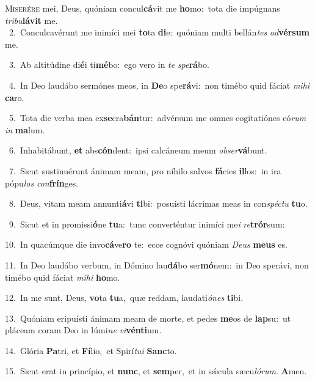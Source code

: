 \lettrine{\initial\textcolor{\initialcolor}{M}}{iserére} mei, Deus, quóniam concul\-\textbf{cá}\-vit me \textbf{ho}\-mo:~\star tota die impúgnans \textit{tri}\-\textit{bu}\textbf{lá}\textbf{vit} me.\\
{\numbfont\textcolor{\numbcolor}{~2.}}~Conculcavérunt me inimíci mei \textbf{to}\-ta \textbf{di}\-e:~\star quóniam multi bellán\textit{tes} \textit{ad}\-\textbf{vér}\textbf{sum} me.\par
{\numbfont\textcolor{\numbcolor}{~3.}}~Ab altitúdine di\-\textbf{é}\-i ti\-\textbf{mé}\-bo:~\star ego vero in \textit{te} \textit{spe}\-\textbf{rá}bo.\par
{\numbfont\textcolor{\numbcolor}{~4.}}~In Deo laudábo sermónes meos, in \textbf{De}\-o spe\-\textbf{rá}\-vi:~\star non timébo quid fáciat \textit{mi}\-\textit{hi} \textbf{ca}\-ro.\par
{\numbfont\textcolor{\numbcolor}{~5.}}~Tota die verba mea ex\-\textbf{se}\-cra\-\textbf{bán}\-tur:~\star advérsum me omnes cogitatiónes eó\textit{rum} \textit{in} \textbf{ma}\-lum.\par
{\numbfont\textcolor{\numbcolor}{~6.}}~Inhabitábunt, \textbf{et} abs\-\textbf{cón}\-dent:~\star ipsi calcáneum meum \textit{ob}\-\textit{ser}\textbf{vá}bunt.\par
{\numbfont\textcolor{\numbcolor}{~7.}}~Sicut sustinuérunt ánimam meam, pro níhilo salvos \textbf{fá}\-cies \textbf{il}\-los:~\star in ira pópu\textit{los} \textit{con}\-\textbf{frín}ges.\par
{\numbfont\textcolor{\numbcolor}{~8.}}~Deus, vitam meam annunti\-\textbf{á}\-vi \textbf{ti}\-bi:~\star posuísti lácrimas meas in con\-\textit{spéc}\-\textit{tu} \textbf{tu}\-o.\par
{\numbfont\textcolor{\numbcolor}{~9.}}~Sicut et in promissi\-\textbf{ó}\-ne \textbf{tu}\-a:~\star tunc converténtur inimíci me\textit{i} \textit{re}\-\textbf{trór}sum:\par
{\numbfont\textcolor{\numbcolor}{10.}}~In quacúmque die invo\-\textbf{cá}\-ve\textbf{ro} te:~\star ecce cognóvi quóniam \textit{De}\-\textit{us} \textbf{me}\-\textbf{us} es.\par
{\numbfont\textcolor{\numbcolor}{11.}}~In Deo laudábo verbum, in Dómino lau\-\textbf{dá}\-bo ser\-\textbf{mó}\-nem:~\star in Deo sperávi, non timébo quid fáciat \textit{mi}\-\textit{hi} \textbf{ho}\-mo.\par
{\numbfont\textcolor{\numbcolor}{12.}}~In me sunt, Deus, \textbf{vo}\-ta \textbf{tu}\-a,~\star quæ reddam, laudati\-\textit{ó}\-\textit{nes} \textbf{ti}\-bi.\par
{\numbfont\textcolor{\numbcolor}{13.}}~Quóniam eripuísti ánimam meam de morte, et pedes \textbf{me}\-os de \textbf{lap}\-su:~\star ut pláceam coram Deo in lúmi\textit{ne} \textit{vi}\-\textbf{vén}\textbf{ti}um.\par
{\numbfont\textcolor{\numbcolor}{14.}}~Glória \textbf{Pa}\-tri, et \textbf{Fí}\-lio,~\star et Spirí\-\textit{tu}\-\textit{i} \textbf{Sanc}\-to.\par
{\numbfont\textcolor{\numbcolor}{15.}}~Sicut erat in princípio, et \textbf{nunc}\-, et \textbf{sem}\-per,~\star et in sǽcula sæcu\-\textit{ló}\-\textit{rum}. \textbf{A}\-men.\par
